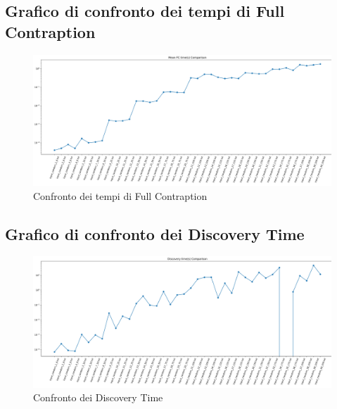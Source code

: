\subsection{Grafico di confronto dei tempi di Full Contraption}
\begin{center}
	\begin{figure}[H]
		\centering
		\hspace{-1cm}\includegraphics[width=\linewidth]{Img/fc_time_graph.jpg}
		\caption{Confronto dei tempi di Full Contraption}
	\end{figure}
\end{center}

\subsection{Grafico di confronto dei Discovery Time}
\begin{center}
	\begin{figure}[H]
		\centering
		\hspace{-1cm}\includegraphics[width=\linewidth]{Img/disc_time_graph.jpg}
		\caption{Confronto dei Discovery Time}
	\end{figure}
\end{center}

